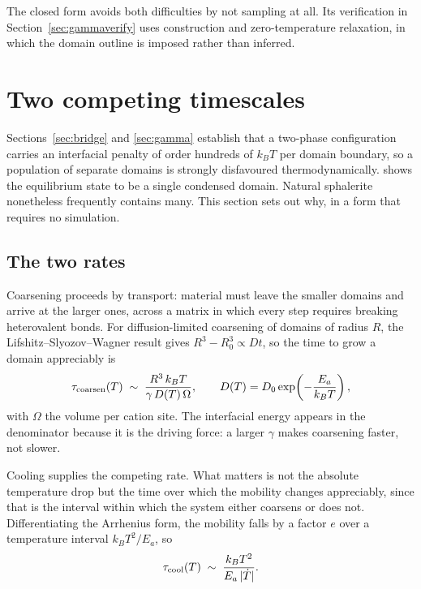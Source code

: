 \documentclass[11pt,a4paper]{article}
\begin{document}
The closed form avoids both difficulties by not sampling at all. Its verification
in Section~\ref{sec:gammaverify} uses construction and zero-temperature
relaxation, in which the domain outline is imposed rather than inferred.

\section{Two competing timescales}
\label{sec:timescales}

Sections~\ref{sec:bridge} and \ref{sec:gamma} establish that a two-phase
configuration carries an interfacial penalty of order hundreds of $k_BT$ per
domain boundary, so a population of separate domains is strongly disfavoured
thermodynamically. \citet{yu2026b} shows the equilibrium state to be a single
condensed domain. Natural sphalerite nonetheless frequently contains many. This
section sets out why, in a form that requires no simulation.

\subsection{The two rates}

Coarsening proceeds by transport: material must leave the smaller domains and
arrive at the larger ones, across a matrix in which every step requires breaking
heterovalent bonds. For diffusion-limited coarsening of domains of radius $R$,
the Lifshitz--Slyozov--Wagner result \citep{lifshitz1961} gives
$R^3 - R_0^3 \propto D t$, so the
time to grow a domain appreciably is
\begin{equation}
\tau_{\rm coarsen}(T) \;\sim\; \frac{R^3\, k_B T}{\gamma\, D(T)\, \Omega},
\qquad
D(T) = D_0 \exp\!\left(-\frac{E_a}{k_B T}\right),
\label{eq:taucoarsen}
\end{equation}
with $\Omega$ the volume per cation site. The interfacial energy appears in the
denominator because it is the driving force: a larger $\gamma$ makes coarsening
faster, not slower.

Cooling supplies the competing rate. What matters is not the absolute
temperature drop but the time over which the mobility changes appreciably, since
that is the interval within which the system either coarsens or does not.
Differentiating the Arrhenius form, the mobility falls by a factor $e$ over a
temperature interval $k_BT^2/E_a$, so
\begin{equation}
\tau_{\rm cool}(T) \;\sim\; \frac{k_B T^2}{E_a\, \lvert \dot{T} \rvert}.
\label{eq:taucool}
\end{equation}
\end{document}
